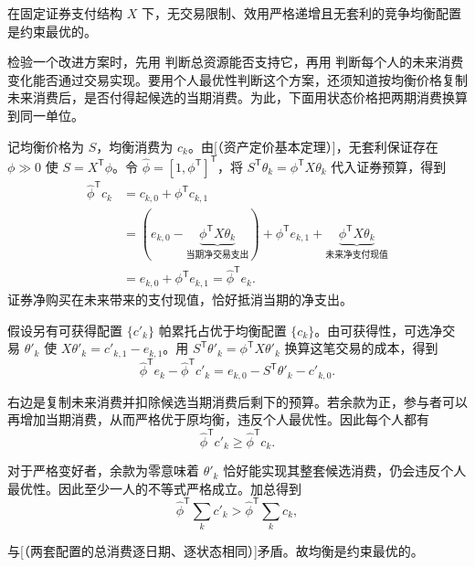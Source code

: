 \begin{tcolorbox}[knowledge]
 在固定证券支付结构 $X$ 下，无交易限制、效用严格递增且无套利的竞争均衡配置是约束最优的。
\end{tcolorbox}

检验一个改进方案时，先用 判断总资源能否支持它，再用 判断每个人的未来消费变化能否通过交易实现。要用个人最优性判断这个方案，还须知道按均衡价格复制未来消费后，是否付得起候选的当期消费。为此，下面用状态价格把两期消费换算到同一单位。

\begin{solution}[label-content={证明},blank-type=none]
记均衡价格为 $S$，均衡消费为 $c_k$。由[（资产定价基本定理）]，无套利保证存在 $\phi\gg0$ 使 $S=X^{\mathsf T}\phi$。令 $\widehat\phi=[1,\phi^{\mathsf T}]^{\mathsf T}$，将 $S^{\mathsf T}\theta_k=\phi^{\mathsf T}X\theta_k$ 代入证券预算，得到
\[
 \begin{aligned}
 \widehat\phi^{\mathsf T}c_k
 &=c_{k,0}+\phi^{\mathsf T}c_{k,1}\\
 &=\left(e_{k,0}-\underbrace{\phi^{\mathsf T}X\theta_k}_{\text{当期净交易支出}}\right)
   +\phi^{\mathsf T}e_{k,1}
   +\underbrace{\phi^{\mathsf T}X\theta_k}_{\text{未来净支付现值}}\\
 &=e_{k,0}+\phi^{\mathsf T}e_{k,1}=\widehat\phi^{\mathsf T}e_k.
 \end{aligned}
\]
证券净购买在未来带来的支付现值，恰好抵消当期的净支出。

假设另有可获得配置 $\{c'_k\}$ 帕累托占优于均衡配置 $\{c_k\}$。由可获得性，可选净交易 $\theta'_k$ 使 $X\theta'_k=c'_{k,1}-e_{k,1}$。用 $S^{\mathsf T}\theta'_k=\phi^{\mathsf T}X\theta'_k$ 换算这笔交易的成本，得到
\[
 \widehat\phi^{\mathsf T}e_k-\widehat\phi^{\mathsf T}c'_k
 =e_{k,0}-S^{\mathsf T}\theta'_k-c'_{k,0}.
\]

右边是复制未来消费并扣除候选当期消费后剩下的预算。若余款为正，参与者可以再增加当期消费，从而严格优于原均衡，违反个人最优性。因此每个人都有
\[
 \widehat\phi^{\mathsf T}c'_k\ge\widehat\phi^{\mathsf T}c_k.
\]

对于严格变好者，余款为零意味着 $\theta'_k$ 恰好能实现其整套候选消费，仍会违反个人最优性。因此至少一人的不等式严格成立。加总得到
\[
 \widehat\phi^{\mathsf T}\sum_kc'_k>
 \widehat\phi^{\mathsf T}\sum_kc_k,
\]

与[（两套配置的总消费逐日期、逐状态相同）]矛盾。故均衡是约束最优的。
\end{solution}

